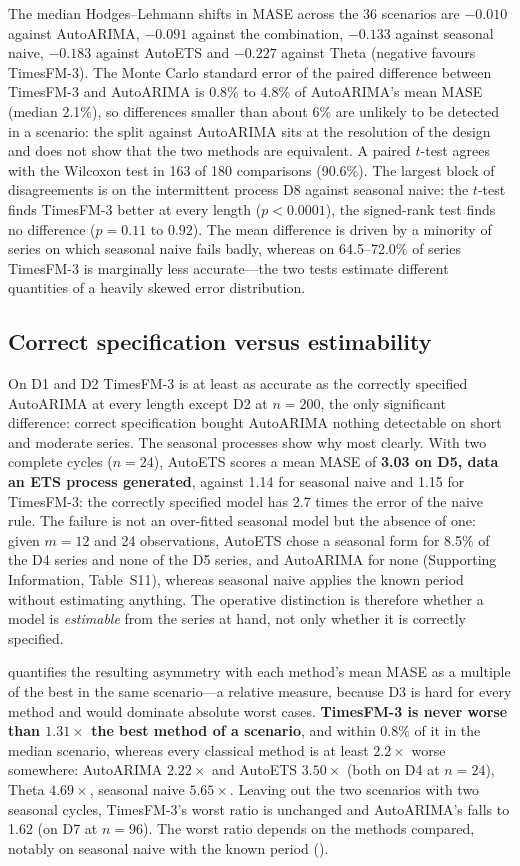 The median Hodges--Lehmann shifts in MASE across the 36 scenarios are $-0.010$ against AutoARIMA, $-0.091$
against the combination, $-0.133$ against seasonal naive, $-0.183$ against AutoETS and $-0.227$ against
Theta (negative favours TimesFM-3). The Monte Carlo standard error of the paired difference between
TimesFM-3 and AutoARIMA is 0.8\% to 4.8\% of AutoARIMA's mean MASE (median 2.1\%), so differences smaller than
about 6\% are unlikely to be detected in a scenario: the split against AutoARIMA sits at the resolution of the
design and does not show that the two methods are equivalent. A paired $t$-test agrees with the Wilcoxon
test in 163 of 180 comparisons (90.6\%). The largest block of disagreements is on the intermittent process D8
against seasonal naive: the $t$-test finds TimesFM-3 better at every length ($p < 0.0001$), the signed-rank
test finds no difference ($p = 0.11$ to $0.92$). The mean difference is driven by a minority of series on
which seasonal naive fails badly, whereas on 64.5--72.0\% of series TimesFM-3 is marginally less
accurate---the two tests estimate different quantities of a heavily skewed error distribution.

\subsection{Correct specification versus estimability}
\label{sec:estimability}

On D1 and D2 TimesFM-3 is at least as accurate as the correctly specified AutoARIMA at every length except
D2 at $n = 200$, the only significant difference: correct specification bought AutoARIMA nothing
detectable on short and moderate series. The seasonal processes show why most clearly. With two complete
cycles ($n = 24$), AutoETS scores a mean MASE of \textbf{3.03 on D5, data an ETS process generated}, against
1.14 for seasonal naive and 1.15 for TimesFM-3: the correctly specified model has 2.7 times the error of the
naive rule. The failure is not an over-fitted seasonal model but the absence of one: given $m = 12$ and 24
observations, AutoETS chose a seasonal form for 8.5\% of the D4 series and none of the D5 series, and
AutoARIMA for none (Supporting Information, Table~S11), whereas seasonal naive applies the known period
without estimating anything. The operative distinction is therefore whether a model is \emph{estimable}
from the series at hand, not only whether it is correctly specified.

 quantifies the resulting asymmetry with each method's mean MASE as a multiple of the
best in the same scenario---a relative measure, because D3 is hard for every method and would dominate absolute
worst cases. \textbf{TimesFM-3 is never worse than $1.31\times$ the best method of a scenario}, and within 0.8\% of
it in the median scenario, whereas every classical method is at least $2.2\times$ worse somewhere: AutoARIMA
$2.22\times$ and AutoETS $3.50\times$ (both on D4 at $n = 24$), Theta $4.69\times$, seasonal naive $5.65\times$.
Leaving out the two scenarios with two seasonal cycles, TimesFM-3's worst ratio is unchanged and AutoARIMA's
falls to 1.62 (on D7 at $n = 96$). The worst ratio depends on the methods compared, notably on seasonal naive
with the known period ().

